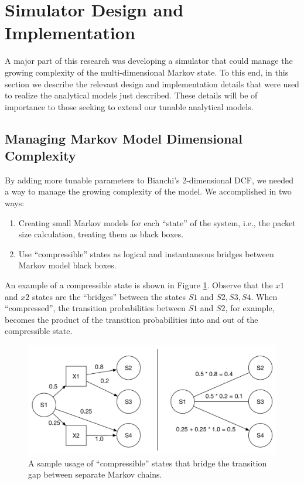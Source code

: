 \documentclass[conference]{IEEEtran}
\begin{document}
\section{Simulator Design and Implementation}
A major part of this research was developing a simulator that could manage the growing complexity of the multi-dimensional Markov state. To this end, in this section we describe the relevant design and implementation details that were used to realize the analytical models just described. These details will be of importance to those seeking to extend our tunable analytical models. 

\subsection{Managing Markov Model Dimensional Complexity}
By adding more tunable parameters to Bianchi's 2-dimensional DCF, we needed a way to manage the growing complexity of the model. We accomplished in two ways:
\begin{enumerate}
	\item Creating small Markov models for each ``state'' of the system, i.e., the packet size calculation, treating them as black boxes.
	\item Use ``compressible'' states as logical and instantaneous bridges between Markov model black boxes.
\end{enumerate}
An example of a compressible state is shown in Figure \ref{fig:collapses}. Observe that the $x1$ and $x2$ states are the ``bridges'' between the states $S1$ and $S2,S3,S4$. When ``compressed'', the transition probabilities between $S1$ and $S2$, for example, becomes the product of the transition probabilities into and out of the compressible state. 

\begin{figure}
\begin{center}
\includegraphics[scale=0.4]{../../sketches/collapses.pdf}
\caption{A sample usage of ``compressible'' states that bridge the transition gap between separate Markov chains.}
\label{fig:collapses}
\end{center}
\end{figure}
\end{document}
